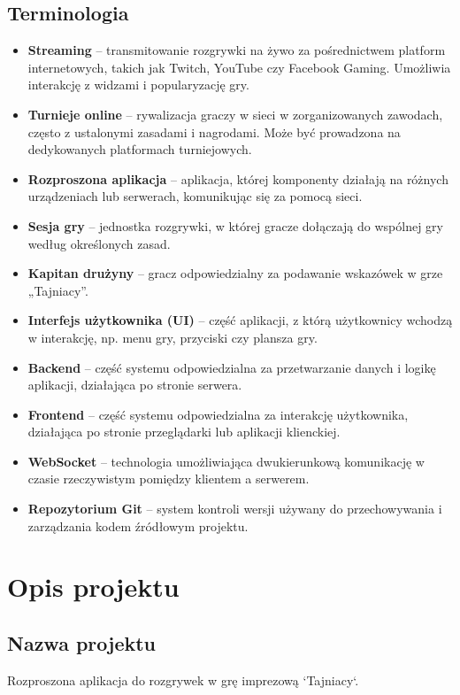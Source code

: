 \documentclass[12pt,a4paper,colorlinks=true,linkcolor=NavyBlue,citecolor=red,urlcolor=NavyBlue]{book}
\begin{document}
\section{Terminologia}
\begin{itemize}
    \item \textbf{Streaming} – transmitowanie rozgrywki na żywo za pośrednictwem platform internetowych, takich jak Twitch, YouTube czy Facebook Gaming. Umożliwia interakcję z widzami i popularyzację gry.
    \item \textbf{Turnieje online} – rywalizacja graczy w sieci w zorganizowanych zawodach, często z ustalonymi zasadami i nagrodami. Może być prowadzona na dedykowanych platformach turniejowych.
    \item \textbf{Rozproszona aplikacja} – aplikacja, której komponenty działają na różnych urządzeniach lub serwerach, komunikując się za pomocą sieci.
    \item \textbf{Sesja gry} – jednostka rozgrywki, w której gracze dołączają do wspólnej gry według określonych zasad.
    \item \textbf{Kapitan drużyny} – gracz odpowiedzialny za podawanie wskazówek w grze „Tajniacy”.
    \item \textbf{Interfejs użytkownika (UI)} – część aplikacji, z którą użytkownicy wchodzą w interakcję, np. menu gry, przyciski czy plansza gry.
    \item \textbf{Backend} – część systemu odpowiedzialna za przetwarzanie danych i logikę aplikacji, działająca po stronie serwera.
    \item \textbf{Frontend} – część systemu odpowiedzialna za interakcję użytkownika, działająca po stronie przeglądarki lub aplikacji klienckiej.
    \item \textbf{WebSocket} – technologia umożliwiająca dwukierunkową komunikację w czasie rzeczywistym pomiędzy klientem a serwerem.
    \item \textbf{Repozytorium Git} – system kontroli wersji używany do przechowywania i zarządzania kodem źródłowym projektu.
\end{itemize}

\chapter{Opis projektu}

\section{Nazwa projektu}
Rozproszona aplikacja do rozgrywek w grę imprezową `Tajniacy`.
\end{document}
